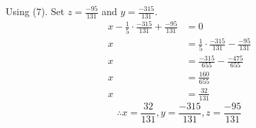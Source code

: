 \documentclass[6pt]{article}
\begin{document}
Using ($7$). Set $z = \frac{-95}{131}$ and $y = \frac{-315}{131}$.
\begin{align*}
    x - \frac{1}{5} \cdot \frac{-315}{131} + \frac{-95}{131} &= 0 \\
    x &=  \frac{1}{5} \cdot \frac{-315}{131} - \frac{-95}{131}  \\
    x &=  \frac{-315}{655} - \frac{-475}{655}  \\
    x &=  \frac{160}{655}  \\
    x &=  \frac{32}{131}
\end{align*}
\[\therefore x = \frac{32}{131}, y = \frac{-315}{131}, z = \frac{-95}{131} \]
\end{document}
